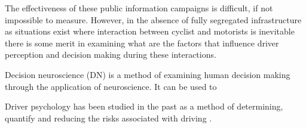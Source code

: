 The effectiveness of these public information campaigns is difficult, if not impossible to measure. However, in the absence of fully segregated infrastructure as situations exist where interaction between cyclist and motorists is inevitable there is some merit in examining what are the factors that influence driver perception and decision making during these interactions.

Decision neuroscience (DN) is a method of examining human decision making through the application of neuroscience. It can be used to 

Driver psychology has been studied in the past as a method of determining, quantify and reducing the risks associated with driving \cite{}.